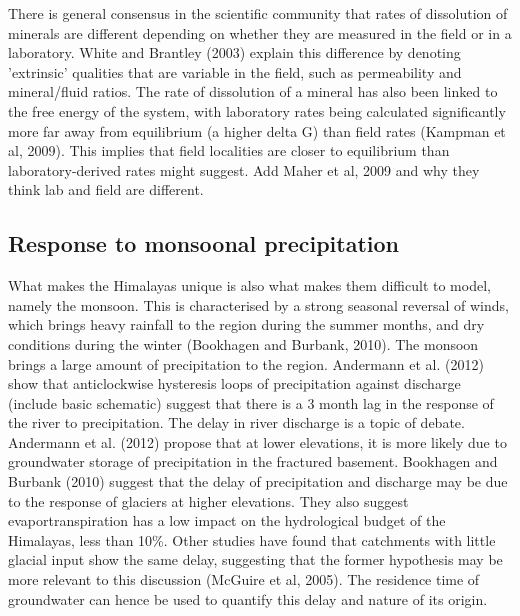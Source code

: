 There is general consensus in the scientific community that rates of dissolution of minerals are different depending on whether they are measured in the field or in a laboratory. White and Brantley (2003) explain this difference by denoting 'extrinsic' qualities that are variable in the field, such as permeability and mineral/fluid ratios. The rate of dissolution of a mineral has also been linked to the free energy of the system, with laboratory rates being calculated significantly more far away from equilibrium (a higher delta G) than field rates (Kampman et al, 2009). This implies that field localities are closer to equilibrium than laboratory-derived rates might suggest. Add Maher et al, 2009 and why they think lab and field are different.

\subsection{Response to monsoonal precipitation}
What makes the Himalayas unique is also what makes them difficult to model, namely the monsoon. This is characterised by a strong seasonal reversal of winds, which brings heavy rainfall to the region during the summer months, and dry conditions during the winter (Bookhagen and Burbank, 2010). The monsoon brings a large amount of precipitation to the region. Andermann et al. (2012) show that anticlockwise hysteresis loops of precipitation against discharge (include basic schematic) suggest that there is a 3 month lag in the response of the river to precipitation.  The delay in river discharge is a topic of debate. Andermann et al. (2012) propose that at lower elevations, it is more likely due to groundwater storage of precipitation in the fractured basement. Bookhagen and Burbank (2010) suggest that the delay of precipitation and discharge may be due to the response of glaciers at higher elevations. They also suggest evaportranspiration has a low impact on the hydrological budget of the Himalayas, less than 10\%. Other studies have found that catchments with little glacial input show the same delay, suggesting that the former hypothesis may be more relevant to this discussion (McGuire et al, 2005). The residence time of groundwater can hence be used to quantify this delay and nature of its origin.




